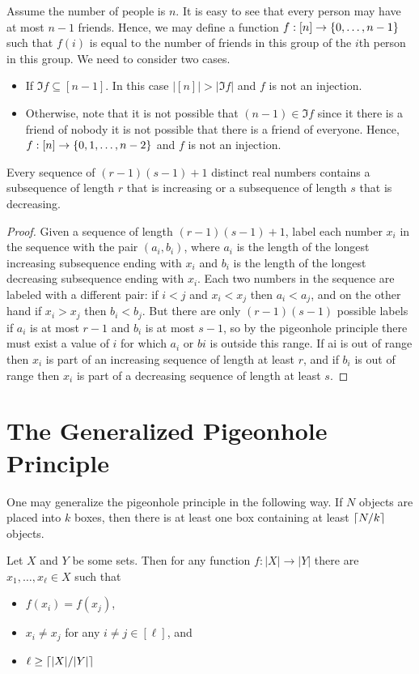 Assume the number of people is $n$. It is easy to see that every person may
have at most $n - 1$ friends. Hence, we may define a function $f: [n] \to
\set{0, \dots, n - 1}$ such that $f(i)$ is equal to the number of friends in
this group of the $i$th person in this group.
We need to consider two cases.
\begin{itemize}
  \item If $\Im f \subseteq [n - 1]$. In this case
    $|[n]| > |\Im f|$ and $f$ is not an injection.
  \item Otherwise, note that it is not possible that $(n - 1) \in \Im f$
    since it there is a friend of nobody it is not possible that there is a
    friend of everyone. Hence, $f : [n] \to \set{0, 1, \dots, n - 2}$ and $f$ is
    not an injection.
\end{itemize}

\begin{theorem}
  Every sequence of $(r - 1)(s - 1) + 1$ distinct real numbers contains a
  subsequence of length $r$ that is increasing or a
  subsequence of length $s$ that is decreasing.
\end{theorem}
\begin{proof}
  Given a sequence of length $(r - 1)(s - 1) + 1$, label each number $x_i$ in
  the sequence with the pair $(a_i, b_i)$, where $a_i$ is the length of the
  longest increasing subsequence ending with $x_i$ and $b_i$ is
  the length of the longest decreasing subsequence ending with $x_i$.
  Each two numbers in the sequence are labeled with a different pair: if $i < j$
  and $x_i < x_j$ then $a_i < a_j$, and on the other hand if $x_i > x_j$ then
  $b_i < b_j$. But there are only $(r - 1)(s - 1)$ possible labels if $a_i$ is
  at most $r - 1$ and $b_i$ is at most $s - 1$, so by the pigeonhole principle
  there must exist a value of $i$ for which $a_i$ or $bi$ is outside this
  range. If ai is out of range then $x_i$ is part of an increasing sequence of
  length at least $r$, and if $b_i$ is out of range then $x_i$ is part of a
  decreasing sequence of length at least $s$.
\end{proof}

\section{The Generalized Pigeonhole Principle}
One may generalize the pigeonhole principle in the following way.
If $N$ objects are placed into $k$ boxes, then there is at least one box
containing at least $\left\lceil {N / k} \right\rceil$ objects.
\begin{theorem}
\label{theorem:generalized-pigeonhole-principle}
  Let $X$ and $Y$ be some sets. Then for any function $f : |X| \to |Y|$ there
  are $x_1, \dots, x_\ell \in X$ such that
  \begin{itemize}
    \item $f(x_i) = f(x_j)$,
    \item $x_i \neq x_j$ for any $i \neq j \in [\ell]$, and
    \item $\ell \ge \left\lceil {|X| / |Y|} \right\rceil$
  \end{itemize}
\end{theorem}

